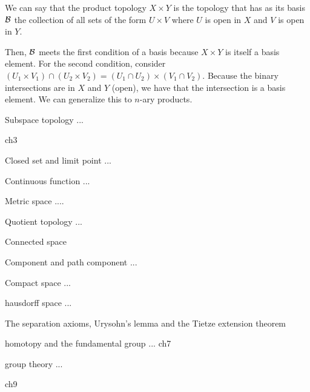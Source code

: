 \documentclass{article}
\begin{document}
\begin{remark}
  We can say that the product topology $X \times Y$ is the topology that has as its basis $\operatorname{\mathcal{B}}$ the collection of all sets of the form $U \times V$ where $U$ is open in $X$ and $V$ is open in $Y$.

  Then, $\operatorname{\mathcal{B}}$ meets the first condition of a basis because $X \times Y$ is itself a basis element. For the second condition, consider $(U_{1} \times V_{1}) \cap (U_{2} \times V_{2}) = (U_{1} \cap U_{2}) \times (V_{1} \cap V_{2})$. Because the binary intersections are in $X$ and $Y$ (open), we have that the intersection is a basis element. We can generalize this to $n$-ary products.
\end{remark}

\begin{definition}
  Subspace topology ...

  ch3
\end{definition}

\begin{definition}
  Closed set and limit point ...
\end{definition}

\begin{definition}
  Continuous function ...
\end{definition}

\begin{definition}
  Metric space ....
\end{definition}

\begin{definition}
  Quotient topology ...
\end{definition}

\begin{definition}
  Connected space
\end{definition}

\begin{definition}
  Component and path component ...
\end{definition}

\begin{definition}
  Compact space ...
\end{definition}

\begin{definition}
  hausdorff space ...
\end{definition}

\begin{definition}
The separation axioms, Urysohn's lemma and the Tietze extension theorem
\end{definition}

\begin{definition}
  homotopy and the fundamental group ...
  ch7
\end{definition}

\begin{definition}
  group theory ...

  ch9
\end{definition}
\end{document}
